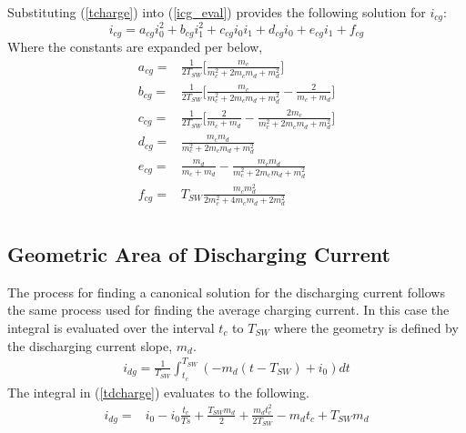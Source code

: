 \documentclass[conference]{IEEEtran}
\begin{document}
Substituting (\ref{tcharge}) into (\ref{icg_eval}) provides the following solution for \(i_{cg}\):
\begin{equation}
i_{cg} = a_{cg}i_0^2+b_{cg}i_1^2+c_{cg}i_0i_1+d_{cg}i_0+e_{cg}i_1+f_{cg} \label{i_cg_canon}
\end{equation}
Where the constants are expanded per below,
\begin{align*}
a_{cg} = & \frac{1}{2T_{SW}} \bigg[ \frac{m_c}{m_c^2+2m_cm_d+m_d^2} \bigg]\nonumber\\
b_{cg} = & \frac{1}{2T_{SW}} \bigg[ \frac{m_c}{m_c^2+2m_cm_d+m_d^2}-\frac{2}{m_c+m_d} \bigg]\nonumber\\
c_{cg} = & \frac{1}{2T_{SW}} \bigg[  \frac{2}{m_c+m_d}-\frac{2m_c}{m_c^2+2m_cm_d+m_d^2} \bigg] \nonumber\\
d_{cg} = & \frac{m_cm_d}{m_c^2+2m_cm_d+m_d^2}\nonumber\\
e_{cg} = & \frac{m_d}{m_c+m_d}-\frac{m_cm_d}{m_c^2+2m_cm_d+m_d^2}\nonumber\\
f_{cg} = & T_{SW} \frac{m_c m_d^2}{2m_c^2+4m_cm_d+2m_d^2}\nonumber\\
\end{align*}

\subsection{Geometric Area of Discharging Current}
The process for finding a canonical solution for the discharging current follows the same process used for finding the average charging current. In this case the integral is evaluated over the interval $t_c$ to $T_{SW}$ where the geometry is defined by the discharging current slope, $m_d$.
\begin{align}
i_{dg} = \frac{1}{T_{SW}}\int_{t_c}^{T_{SW}}(-m_d(t-T_{SW})+i_0)dt
\label{tdcharge}
\end{align}
The integral in (\ref{tdcharge}) evaluates to the following.
\begin{align}
i_{dg} = & i_0-i_0\frac{t_c}{Ts}+\frac{T_{SW}m_d}{2}+\frac{m_dt_c^2}{2T_{SW}}-m_dt_c+T_{SW}m_d
\label{idg_noncanon}
\end{align}
\end{document}
